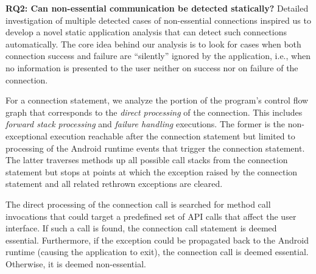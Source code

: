 \noindent 
{\bf RQ2: Can non-essential communication be detected statically?}
Detailed investigation of multiple detected cases of non-essential
connections inspired us to develop a novel static application analysis that
can detect such connections automatically.  The core idea behind our
analysis is to look for cases when both connection success and failure are ``silently'' ignored by the application, i.e., when no information is presented to the user neither on success nor on   failure of the connection. 

For a connection statement, we analyze the portion of the program's
control flow graph that corresponds to the \emph{direct processing} of
the connection.  This includes
\emph{forward stack processing} and \emph{failure handling}
executions.  The former is the non-exceptional execution reachable
after the connection statement but limited to processing of the
Android runtime events that trigger the connection statement.
The latter traverses methods up all possible call stacks from the
connection statement but stops at points at which the
exception raised by the connection statement and all related rethrown
exceptions are cleared.


%

The direct processing of the connection call is searched for method
call invocations that could target a predefined set of API calls that
affect the user interface.  If such a call is found, the connection
call statement is deemed essential.  Furthermore, if the exception
could be propagated back to the Android runtime (causing the
application to exit), the connection call is deemed essential.
Otherwise, it is deemed non-essential.

